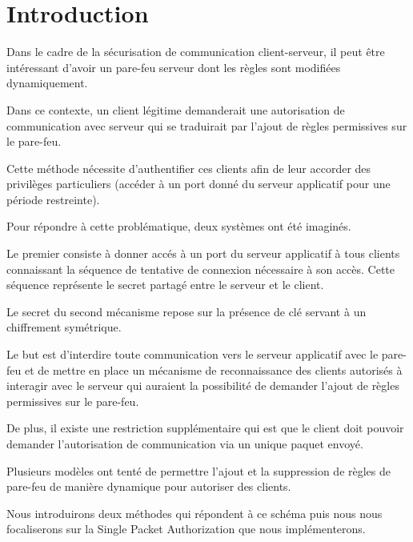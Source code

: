 \chapter*{Introduction}

Dans le cadre de la sécurisation de communication client-serveur, il peut être intéressant d'avoir un pare-feu serveur dont les règles sont modifiées dynamiquement.

Dans ce contexte, un client légitime demanderait une autorisation de communication avec serveur qui se traduirait par l'ajout de règles permissives sur le pare-feu.

Cette méthode nécessite d'authentifier ces clients afin de leur accorder des privilèges particuliers (accéder à un port donné du serveur applicatif pour une période restreinte).

Pour répondre à cette problématique, deux systèmes ont été imaginés.

Le premier consiste à donner accés à un port du serveur applicatif à tous clients connaissant la séquence de tentative de connexion nécessaire à son accès. Cette séquence représente le secret partagé entre le serveur et le client.

Le secret du second mécanisme repose sur la présence de clé servant à un chiffrement symétrique.



Le but est d'interdire toute communication vers le serveur applicatif avec le pare-feu et de mettre en place un mécanisme de reconnaissance des clients autorisés à interagir avec le serveur qui auraient la possibilité de demander l'ajout de règles permissives sur le pare-feu.





De plus, il existe une restriction supplémentaire qui est que le client doit pouvoir demander l'autorisation de communication via un unique paquet envoyé.

Plusieurs modèles ont tenté de permettre l'ajout et la suppression de règles de pare-feu de manière dynamique pour autoriser des clients. 

Nous introduirons deux méthodes qui répondent à ce schéma puis nous nous focaliserons sur la Single Packet Authorization que nous implémenterons.

